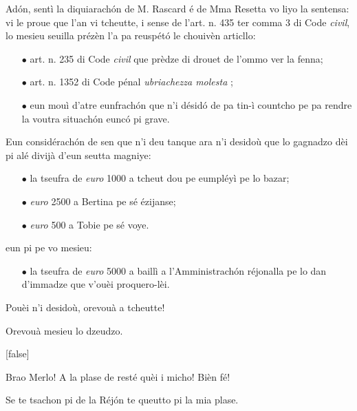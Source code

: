 \begin{drama}
\DzeudzoSenliquerspeaks Adón, sentì la diquiarachón de M. Rascard é de Mma Resetta vo liyo la sentensa: vi le proue que l’an vi tcheutte, i sense de l’art. n. 435 ter comma 3 di Code \textit{civil}, lo mesieu seuilla prézèn l’a pa reuspétó le chouivèn articllo:
\begin{itemize}
\item[$\bullet$] art. n. 235 di Code \textit{civil} que prèdze di drouet de l’ommo ver la fenna;
\item[$\bullet$] art. n. 1352 di Code pénal \textit{ubriachezza molesta} \pionn;
\item[$\bullet$] eun mouì d’atre eunfrachón que n’i désidó de pa tin-ì countcho pe pa rendre la voutra situachón eunc\'o pi grave.
\end{itemize}
Eun considérachón de sen que n’i deu tanque ara n'i desidoù que lo gagnadzo dèi pi alé divijà d’eun seutta magniye:
\begin{itemize}
\item[$\bullet$] la tseufra de \textit{euro} 1000 a tcheut dou pe eumpléyì pe lo bazar;
\item[$\bullet$] \textit{euro} 2500 a Bertina pe sé ézijanse;
\item[$\bullet$] \textit{euro} 500 a Tobie pe sé voye.
\end{itemize}
eun pi pe vo mesieu:
\begin{itemize}
\item[$\bullet$]  la tseufra de \textit{euro} 5000 a baillì a l’Amministrachón réjonalla pe lo dan d’immadze que v'ouèi proquero-lèi.
\end{itemize}
Pouèi n'i desidoù, orevouà a tcheutte!

\tcheuttespeaks Orevouà mesieu lo dzeudzo.

[false]




\Eumprezeospeaks Brao Merlo! A la plase de resté quèi i micho!  Bièn fé!

\Simonspeaks {} Se te tsachon pi de la Réjón te queutto pi la mia plase.



\end{drama}
